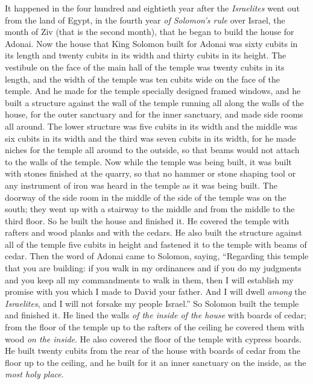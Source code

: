 \begin{biblechapter} %
 It happened in the four hundred and eightieth year after the \textit{Israelites} went out from the land of Egypt, in the fourth year \textit{of Solomon’s rule} over Israel, the month of Ziv (that is the second month), that he began to build the house for Adonai.
\verse Now the house that King Solomon built for Adonai was sixty cubits in its length and twenty cubits in its width and thirty cubits in its height.
\verse The vestibule on the face of the main hall of the temple was twenty cubits in its length, and the width of the temple was ten cubits wide on the face of the temple.
\verse And he made for the temple specially designed framed windows,
\verse and he built a structure against the wall of the temple running all along the walls of the house, for the outer sanctuary and for the inner sanctuary, and made side rooms all around.
\verse The lower structure was five cubits in its width and the middle was six cubits in its width and the third was seven cubits in its width, for he made niches for the temple all around to the outside, so that beams would not attach to the walls of the temple.
\verse Now while the temple was being built, it was built with stones finished at the quarry, so that no hammer or stone shaping tool or any instrument of iron was heard in the temple as it was being built.
\verse The doorway of the side room in the middle of the side of the temple was on the south; they went up with a stairway to the middle and from the middle to the third floor.
\verse So he built the house and finished it. He covered the temple with rafters and wood planks and with the cedars.
\verse He also built the structure against all of the temple five cubits in height and fastened it to the temple with beams of cedar.
\verse Then the word of Adonai came to Solomon, saying,
\verse “Regarding this temple that you are building: if you walk in my ordinances and if you do my judgments and you keep all my commandments to walk in them, then I will establish my promise with you which I made to David your father.
\verse And I will dwell \textit{among} the \textit{Israelites}, and I will not forsake my people Israel.”
\verse So Solomon built the temple and finished it.
\verse He lined the walls \textit{of the inside of the house} with boards of cedar; from the floor of the temple up to the rafters of the ceiling he covered them with wood \textit{on the inside}. He also covered the floor of the temple with cypress boards.
\verse He built twenty cubits from the rear of the house with boards of cedar from the floor up to the ceiling, and he built for it an inner sanctuary on the inside, as the \textit{most holy place}.

\end{biblechapter}

